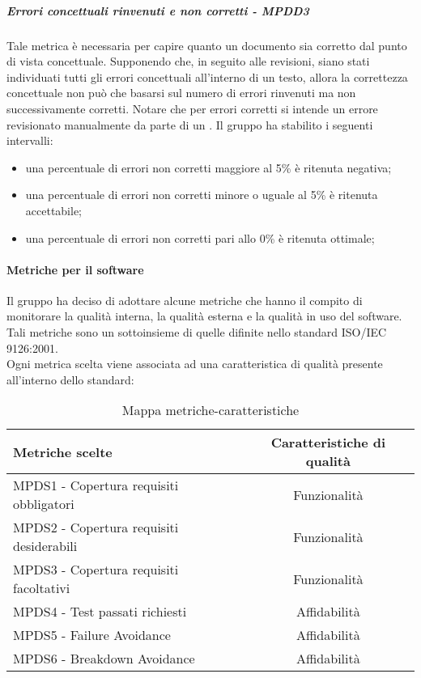 \documentclass[PianoDiQualifica.tex]{subfiles}
\begin{document}
				\hypertarget{err_concettuali}{\subparagraph{Errori concettuali rinvenuti e non corretti - MPDD3}}
				Tale metrica è necessaria per capire quanto un documento sia corretto dal punto di vista concettuale. Supponendo che, in seguito alle revisioni,
				siano stati individuati tutti gli errori concettuali all’interno di un testo, allora la correttezza concettuale non può che basarsi
				sul numero di errori rinvenuti ma non successivamente corretti. Notare che per errori corretti si intende un errore revisionato manualmente da parte
				di un \VER{}.
				Il gruppo ha stabilito i seguenti intervalli:
				\begin{itemize}
					\item una percentuale di errori non corretti maggiore al 5\% è ritenuta negativa;
					\item una percentuale di errori non corretti minore o uguale al 5\% è ritenuta accettabile;
					\item una percentuale di errori non corretti pari allo 0\% è ritenuta ottimale;
				\end{itemize}
				
			\paragraph{Metriche per il software}
			Il gruppo \GRUPPO{} ha deciso di adottare alcune metriche che hanno il compito di monitorare la qualità interna, la qualità esterna e
			la qualità in uso del software. Tali metriche sono un sottoinsieme di quelle difinite nello standard ISO/IEC 9126:2001. \\
			Ogni metrica scelta viene associata ad una caratteristica di qualità presente all’interno dello standard: \\
			\begin{table}[h]
				\centering
				\begin{tabular}{l c}
					\hline
					\rule[-0.3cm]{0cm}{0.8cm}
					\textbf{Metriche scelte} & \textbf{Caratteristiche di qualità} \\
					\hline
					\rule[0cm]{0cm}{0.4cm}
					MPDS1 - Copertura requisiti obbligatori & Funzionalità \\
					\rule[0cm]{0cm}{0.4cm}
					MPDS2 - Copertura requisiti desiderabili & Funzionalità \\
					\rule[0cm]{0cm}{0.4cm}
					MPDS3 - Copertura requisiti facoltativi & Funzionalità \\
					\rule[0cm]{0cm}{0.4cm}
					MPDS4 - Test passati richiesti & Affidabilità \\
					\rule[0cm]{0cm}{0.4cm}
					MPDS5 - Failure Avoidance & Affidabilità \\
					\rule[0cm]{0cm}{0.4cm}
					MPDS6 - Breakdown Avoidance & Affidabilità \\
					\hline
				\end{tabular}
				\caption{Mappa metriche-caratteristiche}
			\end{table}
			
\end{document}
